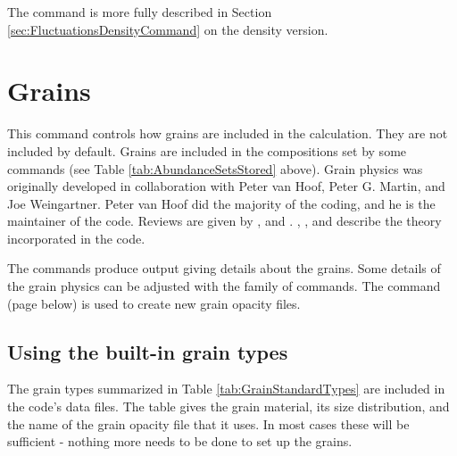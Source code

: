 The  command is more fully described in
Section \ref{sec:FluctuationsDensityCommand} on the density version.

\section{Grains}
\label{sec:GrainsCommand}

This command controls how grains are included in the calculation.
They are not included by default.
Grains are included in the compositions set
by some  commands
(see Table \ref{tab:AbundanceSetsStored} above).
Grain physics
was originally developed in collaboration with
Peter van Hoof, Peter G. Martin, and
Joe Weingartner. Peter van Hoof did the majority of the coding,
and he is the maintainer of the code.
Reviews are given by \citet{Spitzer1948,Spitzer1978}, and \citet{Martin1979}.
\citet{Baldwin1991},
\citet{Weingartner2001b}, \citet{VanHoof2004} and
\citet{Weingartner2006} describe the theory incorporated in the code.

The  commands produce
output giving details about the grains.
Some details of the grain physics
can be adjusted with the  family of commands.
The  command
(page \pageref{sec:CompileGrains} below) is used to 
create new grain opacity files.

\subsection{Using the built-in grain types}

The grain types summarized in Table \ref{tab:GrainStandardTypes} are
included in the code's data files.
The table gives the grain material, its size distribution,
and the name of the grain opacity file that it uses.
In most cases these
will be sufficient - nothing more needs to be done to set up the grains.

